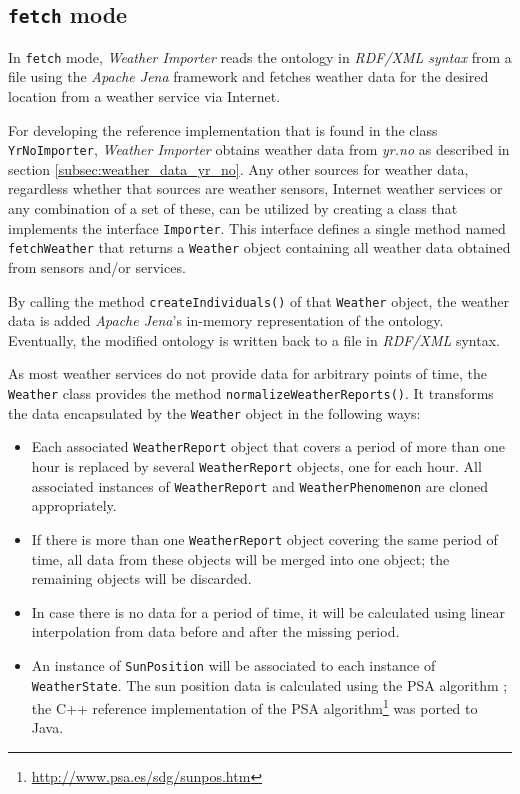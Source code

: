 \subsection{\texttt{fetch} mode}
\label{subsec:importer_fetch}
In \texttt{fetch} mode, \emph{Weather Importer} reads the \thinkhomeweather ontology in \emph{RDF/XML syntax} from a file using the \emph{Apache Jena} framework and fetches weather data for the desired location from a weather service via Internet.

For developing the reference implementation that is found in the class \texttt{YrNoImporter}, \emph{Weather Importer} obtains weather data from \emph{yr.no} as described in section \ref{subsec:weather_data_yr_no}. Any other sources for weather data, regardless whether that sources are weather sensors, Internet weather services or any combination of a set of these, can be utilized by creating a class that implements the interface \texttt{Importer}. This interface defines a single method named \texttt{fetchWeather} that returns a \texttt{Weather} object containing all weather data obtained from sensors and/or services.

By calling the method \texttt{createIndividuals()} of that \texttt{Weather} object, the weather data is added \emph{Apache Jena}'s in-memory representation of the ontology. Eventually, the modified ontology is written back to a file in \emph{RDF/XML} syntax.

As most weather services do not provide data for arbitrary points of time, the \texttt{Weather} class provides the method \texttt{normalizeWeatherReports()}. It transforms the data encapsulated by the \texttt{Weather} object in the following ways:
\begin{itemize}
  \item Each associated \texttt{WeatherReport} object that covers a period of more than one hour is replaced by several \texttt{WeatherReport} objects, one for each hour. All associated instances of \texttt{WeatherReport} and \texttt{WeatherPhenomenon} are cloned appropriately.
  \item If there is more than one \texttt{WeatherReport} object covering the same period of time, all data from these objects will be merged into one object; the remaining objects will be discarded.
  \item In case there is no data for a period of time, it will be calculated using linear interpolation from data before and after the missing period.
  \item An instance of \texttt{SunPosition} will be associated to each instance of \texttt{WeatherState}. The sun position data is calculated using the PSA algorithm \cite{PSA_algorithm}; the C++ reference implementation of the PSA algorithm\footnote{\href{http://www.psa.es/sdg/sunpos.htm}{http://www.psa.es/sdg/sunpos.htm}} was ported to Java.
\end{itemize}

